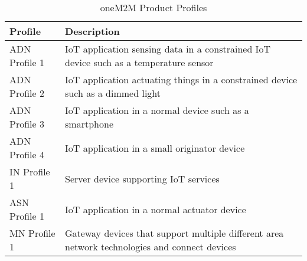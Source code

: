 \begin{table}[ht]
\label{ProductProfiles}
\setlength{\tabcolsep}{3pt}

\begin{center}
\begin{tabular}{|p{3cm}|p{9cm}|}
\hline 
\centering Profile & \hspace{3.3cm}Description\\
\hline
\centering  ADN Profile 1 & IoT application sensing data in a constrained IoT
                            device such as a temperature sensor\\
\hline
\centering  ADN Profile 2 & IoT application actuating things in a
                            constrained device such as a dimmed light\\
\hline
\centering  ADN Profile 3 & IoT application in a normal device such as
  a smartphone \\
\hline
\centering  ADN Profile 4 & IoT application in a small originator device \\
\hline
\centering  IN Profile 1 & Server device supporting IoT services\\
\hline
\centering  ASN Profile 1 & IoT application in a normal actuator
                            device \\
\hline
\centering  MN Profile 1 & Gateway devices that support multiple
                           different area network technologies and
                           connect devices\\ 
\hline
\end{tabular}
\end{center}
\caption{oneM2M Product Profiles}
\label{tab:onemwm_adn}
\end{table}